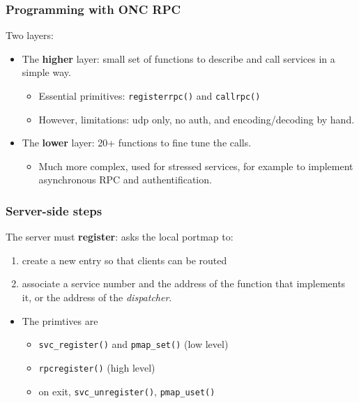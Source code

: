 \documentclass[bigger,hyperref={colorlinks=true, urlcolor=red, plainpages=false, pdfpagelabels, bookmarksnumbered}]{beamer}
\begin{document}
\begin{frame}
\frametitle{Programming with ONC RPC}
\label{sec-2-7}

   Two layers:
\begin{itemize}

\item The \textbf{higher} layer: small set of functions to describe and call services in a simple way.
\label{sec-2-7-1}%
\begin{itemize}
\item Essential primitives: \texttt{registerrpc()} and \texttt{callrpc()} \\
\item However, limitations: udp only, no auth, and encoding/decoding by hand.
\end{itemize}


\item The \textbf{lower} layer: 20+ functions to fine tune the calls.
\label{sec-2-7-2}%
\begin{itemize}
\item Much more complex, used for stressed services, for example 
     to implement asynchronous RPC and authentification.
\end{itemize}

\end{itemize} %
\end{frame}
\begin{frame}
\frametitle{Server-side steps}
\label{sec-2-8}

   The server must \textbf{register}: asks the local portmap to:
\begin{enumerate}
\item create a new entry so that clients can be routed
\item associate a service number and the address of the function 
     that implements it, or the address of the \emph{dispatcher}.
\end{enumerate}
\begin{itemize}

\item The primtives are
\label{sec-2-8-1}%
\begin{itemize}
\item \texttt{svc\_register()} and \texttt{pmap\_set()} (low level)
\item \texttt{rpcregister()} (high level)
\item on exit, \texttt{svc\_unregister()}, \texttt{pmap\_uset()}
\end{itemize}
\end{itemize} %
\end{frame}
\end{document}
